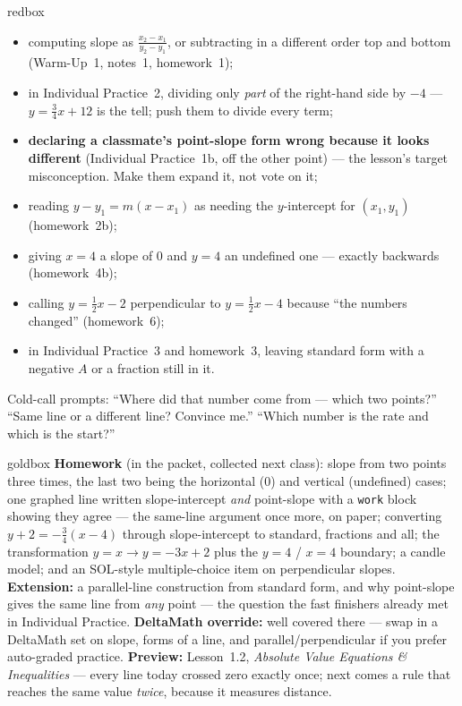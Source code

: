 \documentclass[10pt]{article}
\begin{document}
\boxguard
\begin{skillbox}{redbox}
\begin{itemize}[leftmargin=1.2em, nosep]
  \item computing slope as $\frac{x_2-x_1}{y_2-y_1}$, or subtracting in a different order top and
        bottom (Warm-Up~1, notes~1, homework~1);
  \item in Individual Practice~2, dividing only \emph{part} of the right-hand side by $-4$ ---
        $y=\tfrac34x+12$ is the tell; push them to divide every term;
  \item \textbf{declaring a classmate's point-slope form wrong because it looks different}
        (Individual Practice~1b, off the other point) --- the lesson's target misconception.
        Make them expand it, not vote on it;
  \item reading $y-y_1=m(x-x_1)$ as needing the $y$-intercept for $(x_1,y_1)$ (homework~2b);
  \item giving $x=4$ a slope of $0$ and $y=4$ an undefined one --- exactly backwards (homework~4b);
  \item calling $y=\tfrac12x-2$ perpendicular to $y=\tfrac12x-4$ because ``the numbers changed''
        (homework~6);
  \item in Individual Practice~3 and homework~3, leaving standard form with a negative $A$ or a
        fraction still in it.
\end{itemize}
Cold-call prompts: ``Where did that number come from --- which two points?'' ``Same line or a
different line? Convince me.'' ``Which number is the rate and which is the start?''
\end{skillbox}

\boxguard
\begin{skillbox}{goldbox}
\textbf{Homework} (in the packet, collected next class): slope from two points three times, the last
two being the horizontal ($0$) and vertical (undefined) cases; one graphed line written
slope-intercept \emph{and} point-slope with a \texttt{work} block showing they agree --- the
same-line argument once more, on paper; converting $y+2=-\tfrac34(x-4)$ through slope-intercept to standard, fractions and all; the
transformation $y=x \to y=-3x+2$ plus the $y=4$ / $x=4$ boundary; a candle model; and an SOL-style
multiple-choice item on perpendicular slopes. \textbf{Extension:} a parallel-line construction from
standard form, and why point-slope gives the same line from \emph{any} point --- the question the
fast finishers already met in Individual Practice. \textbf{DeltaMath
override:} well covered there --- swap in a DeltaMath set on slope, forms of a line, and
parallel/perpendicular if you prefer auto-graded practice. \textbf{Preview:} Lesson~1.2,
\emph{Absolute Value Equations \& Inequalities} --- every line today crossed zero exactly once; next
comes a rule that reaches the same value \emph{twice}, because it measures distance.
\end{skillbox}
\end{document}
